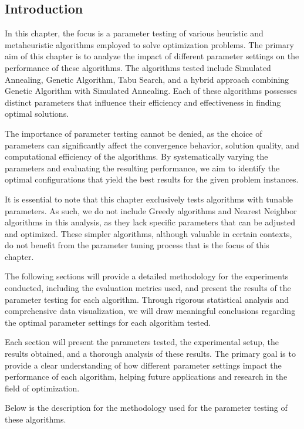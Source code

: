 \documentclass[
]{article}
\begin{document}
    \subsection{Introduction}\label{subsec:introduction2}

    In this chapter, the focus is a parameter testing of various heuristic and metaheuristic algorithms employed to solve optimization problems. The primary aim of this chapter is to analyze the impact of different parameter settings on the performance of these algorithms. The algorithms tested include Simulated Annealing, Genetic Algorithm, Tabu Search, and a hybrid approach combining Genetic Algorithm with Simulated Annealing. Each of these algorithms possesses distinct parameters that influence their efficiency and effectiveness in finding optimal solutions.

    The importance of parameter testing cannot be denied, as the choice of parameters can significantly affect the convergence behavior, solution quality, and computational efficiency of the algorithms. By systematically varying the parameters and evaluating the resulting performance, we aim to identify the optimal configurations that yield the best results for the given problem instances.

    It is essential to note that this chapter exclusively tests algorithms with tunable parameters. As such, we do not include Greedy algorithms and Nearest Neighbor algorithms in this analysis, as they lack specific parameters that can be adjusted and optimized. These simpler algorithms, although valuable in certain contexts, do not benefit from the parameter tuning process that is the focus of this chapter.

    The following sections will provide a detailed methodology for the experiments conducted, including the evaluation metrics used, and present the results of the parameter testing for each algorithm. Through rigorous statistical analysis and comprehensive data visualization, we will draw meaningful conclusions regarding the optimal parameter settings for each algorithm tested.

    Each section will present the parameters tested, the experimental setup, the results obtained, and a thorough analysis of these results. The primary goal is to provide a clear understanding of how different parameter settings impact the performance of each algorithm, helping future applications and research in the field of optimization.

    \noindent Below is the description for the methodology used for the parameter testing of these algorithms.
\end{document}
